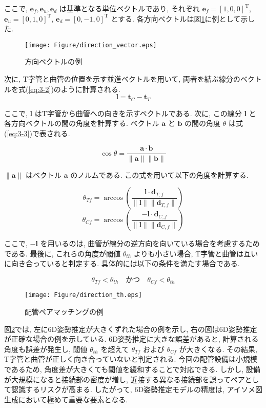 ここで, $\mathbf{e}_f, \mathbf{e}_u, \mathbf{e}_d$ は基準となる単位ベクトルであり, それぞれ $\mathbf{e}_f = [1, 0, 0]^\mathrm{T}$, $\mathbf{e}_u = [0, 1, 0]^\mathrm{T}$, $\mathbf{e}_d = [0, -1, 0]^\mathrm{T}$ とする. 
各方向ベクトルは図\ref{fig:3-f2}に例として示した. 
\begin{figure}[htbt]
  \centering
   \texttt{[image: Figure/direction\_vector.eps]}
   \caption{方向ベクトルの例}
   \label{fig:3-f2}
\end{figure}

次に, T字管と曲管の位置を示す並進ベクトルを用いて, 両者を結ぶ線分のベクトルを式(\ref{eq:3-2})のように計算される. 
\begin{equation}
\mathbf{l} = \mathbf{t}_C - \mathbf{t}_T
\label{eq:3-2}
\end{equation}

ここで, $\mathbf{l}$ はT字管から曲管への向きを示すベクトルである. 
次に, この線分 $\mathbf{l}$ と各方向ベクトルの間の角度を計算する. ベクトル $\mathbf{a}$ と $\mathbf{b}$ の間の角度 $\theta$ は式(\ref{eq:3-3})で表される. 

\begin{equation}
\cos \theta = \frac{\mathbf{a} \cdot \mathbf{b}}{\|\mathbf{a}\| \|\mathbf{b}\|}
\label{eq:3-3}
\end{equation}

$\|\mathbf{a}\|$ はベクトル $\mathbf{a}$ のノルムである. この式を用いて以下の角度を計算する. 

\begin{equation}
\theta_{Tf} = \arccos \left( \frac{\mathbf{l} \cdot \mathbf{d}_{T,f}}{\|\mathbf{l}\| \|\mathbf{d}_{T,f}\|} \right)
\label{eq:3-4}
\end{equation}
\begin{equation}
\theta_{Cf} = \arccos \left( \frac{-\mathbf{l} \cdot \mathbf{d}_{C,f}}{\|\mathbf{l}\| \|\mathbf{d}_{C,f}\|} \right)
\label{eq:3-5}
\end{equation}

ここで, $-\mathbf{l}$ を用いるのは, 曲管が線分の逆方向を向いている場合を考慮するためである. 
最後に, これらの角度が閾値 $\theta_{th}$ よりも小さい場合, T字管と曲管は互いに向き合っていると判定する. 具体的には以下の条件を満たす場合である. 

\[
\theta_{Tf} < \theta_{th} \quad \text{かつ} \quad \theta_{Cf} < \theta_{th}
\]

\begin{figure}[htbt]
  \centering
   \texttt{[image: Figure/direction\_th.eps]}
   \caption{配管ペアマッチングの例}
   \label{fig:3-f3}
\end{figure}
図\ref{fig:3-f3}では, 左に6D姿勢推定が大きくずれた場合の例を示し, 右の図は6D姿勢推定が正確な場合の例を示している. 
6D姿勢推定に大きな誤差があると, 計算される角度も誤差が発生し, 閾値 $\theta_{th}$ を超えて $\theta_{Tf}$ および $\theta_{Cf}$ が大きくなる. 
その結果, T字管と曲管が正しく向き合っていないと判定される. 
今回の配管設備は小規模であるため, 角度差が大きくても閾値を緩和することで対応できる. 
しかし, 設備が大規模になると接続部の密度が増し, 近接する異なる接続部を誤ってペアとして認識するリスクが高まる. 
したがって, 6D姿勢推定モデルの精度は, アイソメ図生成において極めて重要な要素となる. 


